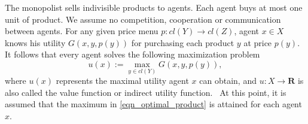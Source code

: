 \documentclass[a4paper, 11pt]{amsart}
\numberwithin{equation}{section}
\theoremstyle{plain}
\theoremstyle{definition}
\theoremstyle{remark}
\newcommand{\R}{\mathbf{R}}
\begin{document}
The monopolist sells indivisible products to agents. Each agent buys at most one unit of product. We assume no competition, cooperation or communication between agents. For any given price menu $p: cl(Y) \longrightarrow cl(Z)$, agent $x \in X$ knows his utility $G(x,y,p(y))$ for purchasing each product $y$ at price $p(y)$. It follows that every agent solves the following maximization problem 
\begin{equation}\label{eqn_optimal_product}
	u(x):=\max_{y \in cl(Y)} G(x, y, p(y)),
\end{equation}
where $u(x)$ represents the maximal utility agent $x$ can obtain, and $u: X \longrightarrow \R$ is also called the value function or indirect utility function.%
~At this point, it is assumed that the maximum in \eqref{eqn_optimal_product} is attained for each agent $x$.
\medskip
\end{document}
